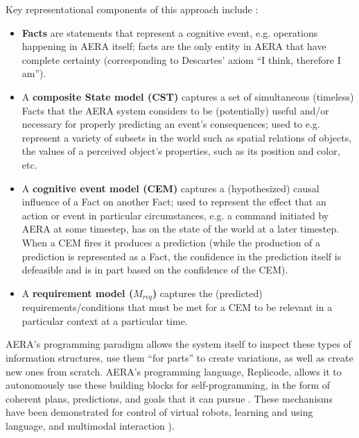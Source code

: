 \documentclass[runningheads]{llncs}
\begin{document}
Key representational components of this approach include \cite{sheikhlar2024autonomous,sheikhlar2024causal}: 
\begin{itemize}
	\item \textbf{Facts} are statements that represent a cognitive event, e.g. operations happening in AERA itself; facts are the only entity in AERA that have complete certainty (corresponding to Descartes' axiom “I think, therefore I am”).
	\item A \textbf{composite State model (CST)} captures a set of simultaneous (timeless) Facts that the AERA system considers to be (potentially) useful and/or necessary for properly predicting an event’s consequences; used to e.g. represent a variety of subsets in the world such as spatial relations of objects, the values of a perceived object’s properties, such as its position and color, etc. %
	\item A \textbf{cognitive event model (CEM)} captures a (hypothesized) causal influence of a Fact on another Fact; used to represent the effect that an action or event in particular circumstances, e.g. a command initiated by AERA at some timestep, has on the state of the world at a later timestep. When a CEM fires it produces a prediction (while the production of a prediction is represented as a Fact, the confidence in the prediction itself is defeasible and is in part based on the confidence of the CEM).
	\item A \textbf{requirement model ($M_{req}$)} captures the (predicted) requirements/conditions that must be met for a CEM to be relevant in a particular context at a particular time.
	
\end{itemize}


AERA’s programming paradigm allows the system itself to inspect these types of information structures, use them “for parts” to create variations, as well as create new ones from scratch. AERA’s programming language, Replicode, allows it to autonomously use these building blocks for self-programming, in the form of coherent plans, predictions, and goals that it can pursue \cite{nivel2013towards,nivel2013replicode,thorisson2012new}. 
These mechanisms have been demonstrated for control of virtual robots, learning and using language, and multimodal interaction \cite{thorisson2014autonomous,sheikhlar2024autonomous}). 
\end{document}
